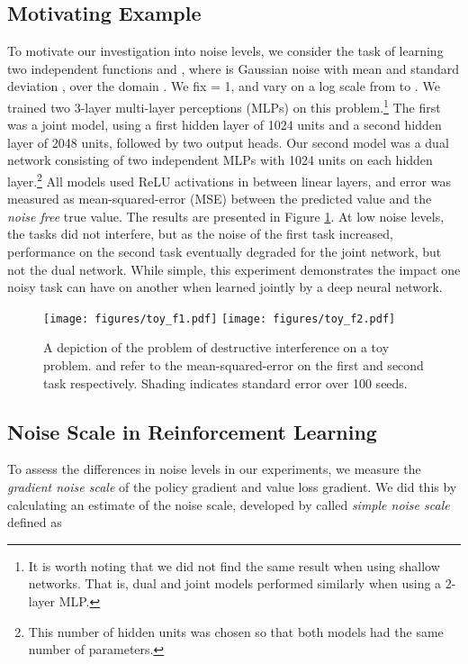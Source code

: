 \documentclass{article}
\begin{document}
\subsection{Motivating Example}

To motivate our investigation into noise levels, we consider the task of learning two independent functions  and , where  is Gaussian noise with mean  and standard deviation ,  over the domain . We fix  = 1, and vary  on a log scale from  to . We trained two 3-layer multi-layer perceptions (MLPs) on this problem.\footnote{It is worth noting that we did not find the same result when using shallow networks. That is, dual and joint models performed similarly when using a 2-layer MLP.}  The first was a joint model, using a first hidden layer of 1024 units and a second hidden layer of 2048 units, followed by two output heads. Our second model was a dual network consisting of two independent MLPs with 1024 units on each hidden layer.\footnote{This number of hidden units was chosen so that both models had the same number of parameters.} All models used ReLU activations in between linear layers, and error was measured as mean-squared-error (MSE) between the predicted value and the \textit{noise free} true value. The results are presented in Figure \ref{fig:toy_noise}. At low noise levels, the tasks did not interfere, but as the noise of the first task increased, performance on the second task eventually degraded for the joint network, but not the dual network. While simple, this experiment demonstrates the impact one noisy task can have on another when learned jointly by a deep neural network.

\begin{figure}[h]
    \centering
    \texttt{[image: figures/toy\_f1.pdf]}
    \texttt{[image: figures/toy\_f2.pdf]}
    \caption{A depiction of the problem of destructive interference on a toy problem.  and  refer to the mean-squared-error on the first and second task respectively. Shading indicates standard error over 100 seeds.}
    \label{fig:toy_noise}
\end{figure}

\subsection{Noise Scale in Reinforcement Learning}



To assess the differences in noise levels in our experiments, we measure the \textit{gradient noise scale} of the policy gradient and value loss gradient. We did this by calculating an estimate of the noise scale, developed by \cite{mccandlish2018empirical} called \textit{simple noise scale} defined as
\end{document}
